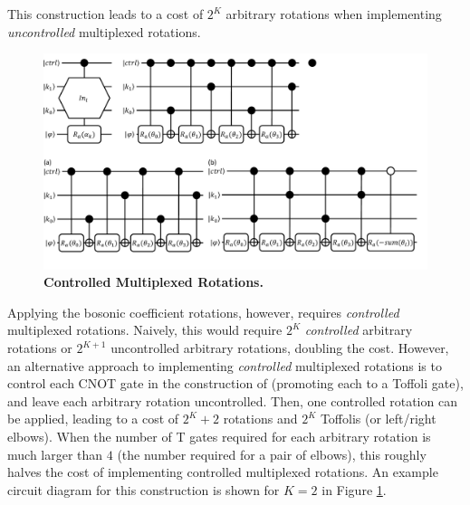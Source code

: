 This construction leads to a cost of $2^K$ arbitrary rotations when implementing \textit{uncontrolled} multiplexed rotations.

\begin{figure}
    \centering
    \includegraphics[width=16cm]{figures/controlled-multiplexed-rotations.pdf}
    \caption{
        \textbf{Controlled Multiplexed Rotations.} 
    }
    \label{fig:controlled-multiplexed-rotations}
\end{figure}

Applying the bosonic coefficient rotations, however, requires \textit{controlled} multiplexed rotations.
Naively, this would require $2^K$ \textit{controlled} arbitrary rotations or $2^{K+1}$ uncontrolled arbitrary rotations, doubling the cost.
However, an alternative approach to implementing \textit{controlled} multiplexed rotations is to control each CNOT gate in the construction of \cite{mottonen2004transformation} (promoting each to a Toffoli gate), and leave each arbitrary rotation uncontrolled.
Then, one controlled rotation can be applied, leading to a cost of $2^K + 2$ rotations and $2^K$ Toffolis (or left/right elbows).
When the number of T gates required for each arbitrary rotation is much larger than $4$ (the number required for a pair of elbows), this roughly halves the cost of implementing controlled multiplexed rotations.
An example circuit diagram for this construction is shown for $K = 2$ in Figure \ref{fig:controlled-multiplexed-rotations}.